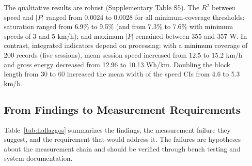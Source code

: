 \documentclass[vehicles,article,submit,moreauthors]{Definitions/mdpi}
\begin{document}
The qualitative results are robust (Supplementary Table S5). The $R^2$ between speed and $|P|$ ranged from 0.0024 to 0.0028 for all minimum-coverage thresholds; saturation ranged from 6.9\% to 9.5\% (and from 7.3\% to 7.6\% with minimum speeds of 3 and 5 km/h); and maximum $|P|$ remained between 355 and 357 W. In contrast, integrated indicators depend on processing: with a minimum coverage of 200 records (five sessions), mean session speed increased from 12.5 to 15.2 km/h and gross energy decreased from 12.96 to 10.13 Wh/km. Doubling the block length from 30 to 60 increased the mean width of the speed CIs from 4.6 to 5.3 km/h.

\subsection{From Findings to Measurement Requirements}

Table~\ref{tab:hallazgos} summarizes the findings, the measurement failure they suggest, and the requirement that would address it. The failures are hypotheses about the measurement chain and should be verified through bench testing and system documentation.
\end{document}
